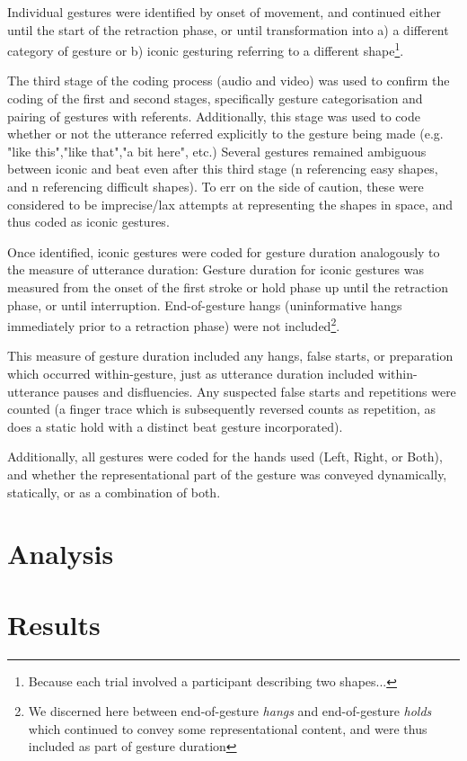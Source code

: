 \documentclass[a4paper,man,natbib]{apa6}
\newcommand*{\term}[1]{\emph{#1}} %
\begin{document}
Individual gestures were identified by onset of movement, and continued either until the start of the retraction phase, or until transformation into a) a different category of gesture or b) iconic gesturing referring to a different shape\footnote{Because each trial involved a participant describing two shapes...}. 

The third stage of the coding process (audio and video) was used to confirm the coding of the first and second stages, specifically gesture categorisation and pairing of gestures with referents.
Additionally, this stage was used to code whether or not the utterance referred explicitly to the gesture being made (e.g. "like this","like that","a bit here", etc.)
Several gestures remained ambiguous between iconic and beat even after this third stage (n referencing easy shapes, and n referencing difficult shapes).%
To err on the side of caution, these were considered to be imprecise/lax attempts at representing the shapes in space, and thus coded as iconic gestures.

Once identified, iconic gestures were coded for gesture duration analogously to the measure of utterance duration:
Gesture duration for iconic gestures was measured from the onset of the first stroke or hold phase up until the retraction phase, or until interruption.
End-of-gesture hangs (uninformative hangs immediately prior to a retraction phase) were not included\footnote{We discerned here between end-of-gesture \term{hangs} and end-of-gesture \term{holds} which continued to convey some representational content, and were thus included as part of gesture duration}.

This measure of gesture duration included any hangs, false starts, or preparation which occurred within-gesture, just as utterance duration included within-utterance pauses and disfluencies.
Any suspected false starts and repetitions were counted (a finger trace which is subsequently reversed counts as repetition, as does a static hold with a distinct beat gesture incorporated).

Additionally, all gestures were coded for the hands used (Left, Right, or Both), and whether the representational part of the gesture was conveyed dynamically, statically, or as a combination of both. 



\section{Analysis}

\section{Results}







\end{document}
